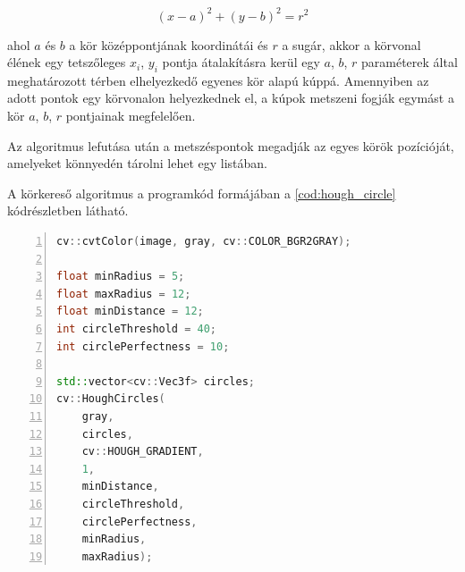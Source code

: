 \begin{equation}
    (x - a)^2 + (y - b)^2 = r^2
    \label{for:hough_transform}
\end{equation}

\par ahol $a$ és $b$ a kör középpontjának koordinátái és $r$ a sugár, akkor a körvonal élének egy tetszőleges $x_i$, $y_i$ pontja átalakításra kerül egy $a$, $b$, $r$ paraméterek által meghatározott térben elhelyezkedő egyenes kör alapú kúppá.\cite{hough_transform,YUEN199071} Amennyiben az adott pontok egy körvonalon helyezkednek el, a kúpok metszeni fogják egymást a kör $a$, $b$, $r$ pontjainak megfelelően.\cite{YUEN199071}
\par Az algoritmus lefutása után a metszéspontok megadják az egyes körök pozícióját, amelyeket könnyedén tárolni lehet egy listában.
\par A körkereső algoritmus a programkód formájában a \ref{cod:hough_circle} kódrészletben látható.

\vspace{2mm}
\hspace{-10mm}
\begin{minipage}{\linewidth}
\begin{lstlisting}[language=C++, numbers=left, caption={A körkereső algoritmus.}, label={cod:hough_circle}]
cv::cvtColor(image, gray, cv::COLOR_BGR2GRAY);

float minRadius = 5;
float maxRadius = 12;
float minDistance = 12;
int circleThreshold = 40;
int circlePerfectness = 10;

std::vector<cv::Vec3f> circles;
cv::HoughCircles(
    gray,
    circles,
    cv::HOUGH_GRADIENT,
    1,
    minDistance,
    circleThreshold,
    circlePerfectness,
    minRadius,
    maxRadius);
\end{lstlisting}
\end{minipage}

